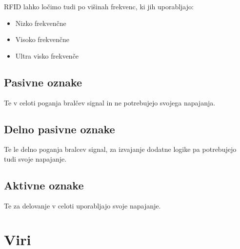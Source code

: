 \documentclass[]{article}
\begin{document}
RFID lahko lo\v{c}imo tudi po vi\v{s}inah frekvenc, ki jih
uporabljajo:
\begin{itemize}
  \item Nizko frekven\v{c}ne
  \item Visoko frekven\v{c}ne
  \item Ultra visko frekven\v{c}e
\end{itemize}


\subsection{Pasivne oznake}
Te v celoti poganja bral\v{c}ev signal in ne potrebujejo svojega
napajanja.


\subsection{Delno pasivne oznake}
Te le delno poganja bralcev signal, za izvajanje dodatne logike
pa potrebujejo tudi svoje napajanje.


\subsection{Aktivne oznake}
Te za delovanje v celoti uporabljajo svoje napajanje.

\clearpage

\section{Viri}
\printbibliography[heading=none] %
\end{document}
